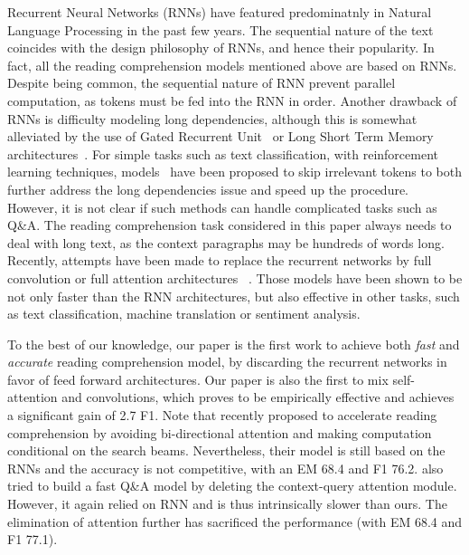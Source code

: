 \documentclass{article} \usepackage{iclr2018_conference,times}
\begin{document}
Recurrent Neural Networks (RNNs) have featured predominatnly in Natural Language Processing in the past few years. 
The sequential nature of the text coincides with the design philosophy of RNNs, and hence their popularity. In fact, all the reading comprehension models mentioned above are based on RNNs.
Despite being common, the sequential nature of RNN prevent parallel computation, as tokens must be fed into the RNN in order. Another drawback of RNNs is difficulty modeling long dependencies, although this is somewhat alleviated by the use of Gated Recurrent Unit~\citep{chung2014empirical} or Long Short Term Memory architectures~\citep{hochreiter1997long}. For simple tasks such as text classification, with reinforcement learning techniques, models~\citep{YuLL17} have been proposed to skip irrelevant tokens to both further address the long dependencies issue and speed up the procedure. However, it is not clear if such methods can handle complicated tasks such as Q\&A.
The reading comprehension task considered in this paper always needs to deal with long text, as the context paragraphs may be hundreds of words long.
Recently, attempts have been made to replace the recurrent networks by 
full convolution or full attention architectures ~\citep{Kim14,gehring2017convolutional,vaswani2017attention,ShenZLJPZ17}. 
Those models have been shown to be not only faster than the RNN architectures, but also effective in other tasks, such as text classification, machine translation or sentiment analysis.


To the best of our knowledge, our paper is the first work  to achieve both \textit{fast} and \textit{accurate} reading comprehension model, by discarding the recurrent networks in favor of feed forward architectures. Our paper is also the first to mix self-attention and convolutions, which proves to be empirically effective and achieves a significant gain of 2.7 F1. Note that \cite{RaimanM17} recently proposed to accelerate reading comprehension by avoiding bi-directional
attention and making computation
conditional on the search beams. Nevertheless, their model is still based on the RNNs and the accuracy is not competitive, with an EM 68.4 and F1 76.2. \cite{WeissenbornWS17} also tried to build a fast Q\&A model by deleting the context-query attention module. However, it again relied on RNN and is thus intrinsically slower than ours. The elimination of attention further has sacrificed the performance (with EM 68.4 and F1 77.1). 
\end{document}
